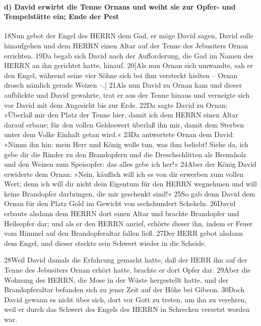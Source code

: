 \hypertarget{d-david-erwirbt-die-tenne-ornans-und-weiht-sie-zur-opfer--und-tempelstuxe4tte-ein-ende-der-pest}{%
\paragraph{d) David erwirbt die Tenne Ornans und weiht sie zur Opfer-
und Tempelstätte ein; Ende der
Pest}\label{d-david-erwirbt-die-tenne-ornans-und-weiht-sie-zur-opfer--und-tempelstuxe4tte-ein-ende-der-pest}}

18Nun gebot der Engel des HERRN dem Gad, er möge David sagen, David
solle hinaufgehen und dem HERRN einen Altar auf der Tenne des Jebusiters
Ornan errichten. 19Da begab sich David nach der Aufforderung, die Gad im
Namen des HERRN an ihn gerichtet hatte, hinauf. 20{[}Als nun Ornan sich
umwandte, sah er den Engel, während seine vier Söhne sich bei ihm
versteckt hielten -- Ornan drosch nämlich gerade Weizen --.{]} 21Als nun
David zu Ornan kam und dieser aufblickte und David gewahrte, trat er aus
der Tenne hinaus und verneigte sich vor David mit dem Angesicht bis zur
Erde. 22Da sagte David zu Ornan: »Überlaß mir den Platz der Tenne hier,
damit ich dem HERRN einen Altar darauf erbaue; für den vollen Geldeswert
überlaß ihn mir, damit dem Sterben unter dem Volke Einhalt getan wird.«
23Da antwortete Ornan dem David: »Nimm ihn hin: mein Herr und König
wolle tun, was ihm beliebt! Siehe da, ich gebe dir die Rinder zu den
Brandopfern und die Dreschschlitten als Brennholz und den Weizen zum
Speisopfer: das alles gebe ich her!« 24Aber der König David erwiderte
dem Ornan: »Nein, käuflich will ich es von dir erwerben zum vollen Wert;
denn ich will dir nicht dein Eigentum für den HERRN wegnehmen und will
keine Brandopfer darbringen, die mir geschenkt sind!« 25So gab denn
David dem Ornan für den Platz Gold im Gewicht von sechshundert Schekeln.
26David erbaute alsdann dem HERRN dort einen Altar und brachte
Brandopfer und Heilsopfer dar; und als er den HERRN anrief, erhörte
dieser ihn, indem er Feuer vom Himmel auf den Brandopferaltar fallen
ließ. 27Der HERR gebot alsdann dem Engel, und dieser steckte sein
Schwert wieder in die Scheide.

28Weil David damals die Erfahrung gemacht hatte, daß der HERR ihn auf
der Tenne des Jebusiters Ornan erhört hatte, brachte er dort Opfer dar.
29Aber die Wohnung des HERRN, die Mose in der Wüste hergestellt hatte,
und der Brandopferaltar befanden sich zu jener Zeit auf der Höhe bei
Gibeon. 30Doch David gewann es nicht über sich, dort vor Gott zu treten,
um ihn zu verehren, weil er durch das Schwert des Engels des HERRN in
Schrecken versetzt worden war.

